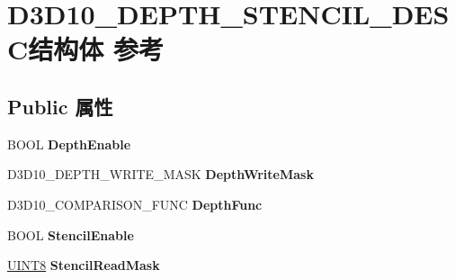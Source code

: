 \hypertarget{struct_d3_d10___d_e_p_t_h___s_t_e_n_c_i_l___d_e_s_c}{}\section{D3\+D10\+\_\+\+D\+E\+P\+T\+H\+\_\+\+S\+T\+E\+N\+C\+I\+L\+\_\+\+D\+E\+S\+C结构体 参考}
\label{struct_d3_d10___d_e_p_t_h___s_t_e_n_c_i_l___d_e_s_c}
\subsection*{Public 属性}
\begin{DoxyCompactItemize}
\item 
\mbox{\label{struct_d3_d10___d_e_p_t_h___s_t_e_n_c_i_l___d_e_s_c_a939586cbc20b38114a2b1ee286135298}} 
B\+O\+OL {\bfseries Depth\+Enable}
\item 
\mbox{\label{struct_d3_d10___d_e_p_t_h___s_t_e_n_c_i_l___d_e_s_c_a7f9ecb356c7c61c28dceed8eebda72ee}} 
D3\+D10\+\_\+\+D\+E\+P\+T\+H\+\_\+\+W\+R\+I\+T\+E\+\_\+\+M\+A\+SK {\bfseries Depth\+Write\+Mask}
\item 
\mbox{\label{struct_d3_d10___d_e_p_t_h___s_t_e_n_c_i_l___d_e_s_c_a97a6194fa2b5f234c768d20da0b629f7}} 
D3\+D10\+\_\+\+C\+O\+M\+P\+A\+R\+I\+S\+O\+N\+\_\+\+F\+U\+NC {\bfseries Depth\+Func}
\item 
\mbox{\label{struct_d3_d10___d_e_p_t_h___s_t_e_n_c_i_l___d_e_s_c_a095d56341fc801f4206506b930ef1fb1}} 
B\+O\+OL {\bfseries Stencil\+Enable}
\item 
\mbox{\label{struct_d3_d10___d_e_p_t_h___s_t_e_n_c_i_l___d_e_s_c_a241b90b6ac425bc2189a2ebcca4b88e9}} 
\hyperlink{_processor_bind_8h_ab27e9918b538ce9d8ca692479b375b6a}{U\+I\+N\+T8} {\bfseries Stencil\+Read\+Mask}
\item 
\mbox{\label{struct_d3_d10___d_e_p_t_h___s_t_e_n_c_i_l___d_e_s_c_a114f6968505605fb1554af428af64f38}} 

\end{DoxyCompactItemize}
